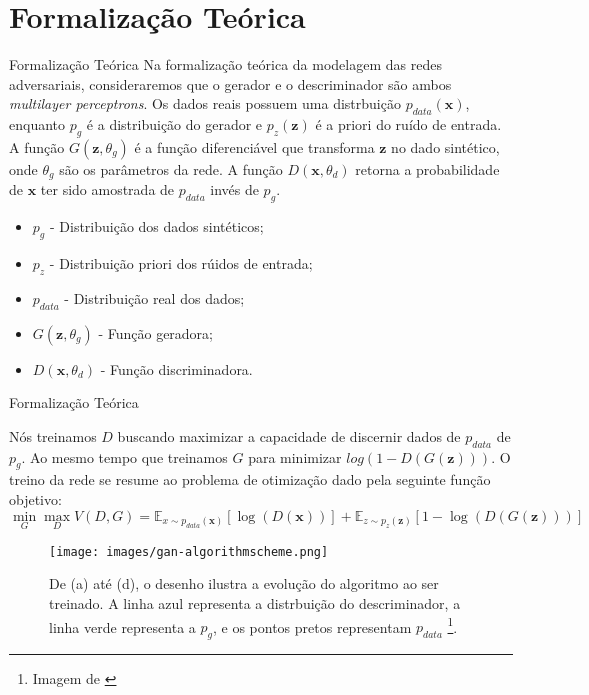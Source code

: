 \documentclass[10pt]{beamer}
\begin{document}
\AtBeginSection{}
\section[Teoria]{Formalização Teórica}
\begin{frame}[fragile]{Formalização Teórica}
	Na formalização teórica da modelagem das
	redes adversariais, consideraremos que
	o gerador e o descriminador são ambos \textit{multilayer perceptrons}.
	Os dados reais possuem uma distrbuição
	$p_{data}(\bm x)$, enquanto $p_g$ é a distribuição do gerador e
	$p_z(\bm z)$ é a priori do ruído de entrada. A função
	$G(\bm z, \theta_g)$ é a função diferenciável que transforma $\bm z$ no
	dado sintético, onde $\theta_g$ são os parâmetros da rede.
	A função $D(\bm x, \theta_d)$ retorna a probabilidade de $\bm x$ ter
	sido amostrada de $p_{data}$ invés de $p_g$.
	\begin{itemize}
		\item $p_g$ - Distribuição dos dados sintéticos;
		\item $p_z$ - Distribuição priori dos rúidos de entrada;
		\item $p_{data}$ - Distribuição real dos dados;
		\item $G(\bm z,\theta_g)$ - Função geradora;
		\item $D(\bm x,\theta_d)$ - Função discriminadora.
	\end{itemize}
\end{frame}


\begin{frame}[fragile]{Formalização Teórica}

	Nós treinamos $D$ buscando maximizar
	a capacidade de discernir dados de $p_{data}$ de $p_g$. Ao
	mesmo tempo que treinamos $G$ para minimizar $log(1-D(G(\bm z)))$.
	O treino da rede se resume ao problema de otimização dado
	pela seguinte função objetivo:
	\small
    $$
    \min_{G} \max_D V(D,G) =
    \mathbb{E}_{x\sim p_{data}(\bm x)}\left[\log{(D(\bm x))}\right]+
    \mathbb{E}_{z\sim p_z(\bm z)}\left[1-\log{(D(G(\bm z)))}\right]
    $$

    \begin{figure}[H]
        \centering
        \texttt{[image: images/gan-algorithmscheme.png]}
        \caption{De (a) até (d), o desenho ilustra a evolução do
        algoritmo ao ser treinado. A linha azul representa a
        distrbuição do descriminador, a linha verde representa
        a $p_g$, e os pontos pretos representam $p_{data}$
        \footnote{Imagem de \citet{goodfellow2014}}.}
    \end{figure}

\end{frame}
\end{document}
